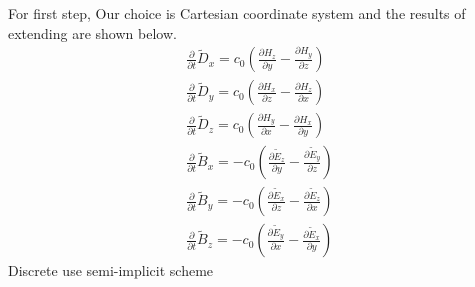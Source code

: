 For first step, Our choice is Cartesian coordinate system and the results of extending are shown below.
\begin{gather}
  \frac{\partial}{\partial t}\widetilde{D}_x = c_0\left(\frac{\partial H_z}{\partial y} - \frac{\partial H_y}{\partial z}\right)\label{eq:up_d_x}\\
  \frac{\partial}{\partial t}\widetilde{D}_y = c_0\left(\frac{\partial H_x}{\partial z} - \frac{\partial H_z}{\partial x}\right)\label{eq:up_d_y}\\
  \frac{\partial}{\partial t}\widetilde{D}_z = c_0\left(\frac{\partial H_y}{\partial x} - \frac{\partial H_x}{\partial y}\right)\label{eq:up_d_z}\\
  \frac{\partial}{\partial t}\widetilde{B}_x =-c_0\left(\frac{\partial \widetilde{E}_z}{\partial y} - \frac{\partial \widetilde{E}_y}{\partial z}\right)\label{eq:up_b_x}\\
  \frac{\partial}{\partial t}\widetilde{B}_y =-c_0\left(\frac{\partial \widetilde{E}_x}{\partial z} - \frac{\partial \widetilde{E}_z}{\partial x}\right)\label{eq:up_b_y}\\
  \frac{\partial}{\partial t}\widetilde{B}_z =-c_0\left(\frac{\partial \widetilde{E}_y}{\partial x} - \frac{\partial \widetilde{E}_x}{\partial y}\right)\label{eq:up_b_z}
\end{gather}
\clearpage
Discrete use semi-implicit scheme
